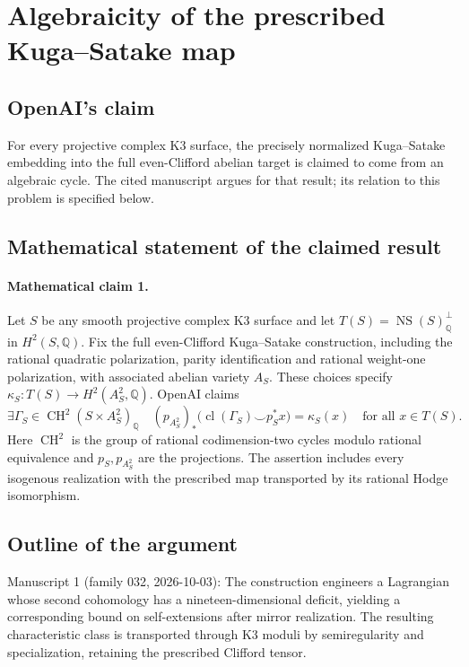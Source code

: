 \documentclass[11pt]{article}
\begin{document}
\section*{Algebraicity of the prescribed Kuga–Satake map}

\subsection{OpenAI's claim}
For every projective complex K3 surface, the precisely normalized Kuga--Satake embedding into the full even-Clifford abelian target is claimed to come from an algebraic cycle. The cited manuscript argues for that result; its relation to this problem is specified below.

\subsection{Mathematical statement of the claimed result}
\paragraph{Mathematical claim 1.} Let $S$ be any smooth projective complex K3 surface and let $T(S)=\operatorname{NS}(S)_{\mathbb Q}^{\perp}$ in $H^2(S,\mathbb Q)$. Fix the full even-Clifford Kuga--Satake construction, including the rational quadratic polarization, parity identification and rational weight-one polarization, with associated abelian variety $A_S$. These choices specify $\kappa_S:T(S)\to H^2(A_S^2,\mathbb Q)$. OpenAI claims
\[
\exists\Gamma_S\in\operatorname{CH}^2(S\times A_S^2)_{\mathbb Q}\quad
(p_{A_S^2})_*\bigl(\operatorname{cl}(\Gamma_S)\smile p_S^*x\bigr)=\kappa_S(x)
\quad\text{for all }x\in T(S).
\]
Here $\operatorname{CH}^2$ is the group of rational codimension-two cycles modulo rational equivalence and $p_S,p_{A_S^2}$ are the projections. The assertion includes every isogenous realization with the prescribed map transported by its rational Hodge isomorphism.

\subsection{Outline of the argument}
Manuscript 1 (family 032, 2026-10-03): The construction engineers a Lagrangian whose second cohomology has a nineteen-dimensional deficit, yielding a corresponding bound on self-extensions after mirror realization. The resulting characteristic class is transported through K3 moduli by semiregularity and specialization, retaining the prescribed Clifford tensor.
\end{document}
